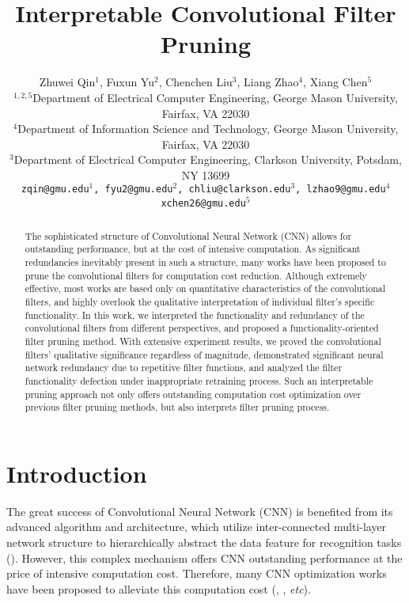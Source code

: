 \documentclass{article} %
\title{Interpretable Convolutional Filter Pruning}
\author{
	Zhuwei Qin$^1$, Fuxun Yu$^2$, Chenchen Liu$^3$, Liang Zhao$^4$, Xiang Chen$^5$ \\
	$^{1,2,5}$Department of Electrical Computer Engineering, George Mason University, Fairfax, VA 22030 \\
	$^{4}$Department of Information Science and Technology, George Mason University, Fairfax, VA 22030 \\
	$^{3}$Department of Electrical Computer Engineering, Clarkson University, Potsdam, NY 13699 \\
	\texttt{zqin@gmu.edu$^1$, fyu2@gmu.edu$^2$, chliu@clarkson.edu$^3$, lzhao9@gmu.edu$^4$}\\
	\texttt{xchen26@gmu.edu$^5$}
}
\begin{document}
\maketitle

\vspace{-3mm}
\begin{abstract}
The sophisticated structure of Convolutional Neural Network (CNN) allows for outstanding performance, but at the cost of intensive computation.
	As significant redundancies inevitably present in such a structure, many works have been proposed to prune the convolutional filters for computation cost reduction.
	Although extremely effective, most works are based only on quantitative characteristics of the convolutional filters, and highly overlook the qualitative interpretation of individual filter's specific functionality.
	In this work, we interpreted the functionality and redundancy of the convolutional filters from different perspectives, and proposed a functionality-oriented filter pruning method.
	With extensive experiment results, we proved the convolutional filters' qualitative significance regardless of magnitude, demonstrated significant neural network redundancy due to repetitive filter functions, and analyzed the filter functionality defection under inappropriate retraining process.
	Such an interpretable pruning approach not only offers outstanding computation cost optimization over previous filter pruning methods, but also interprets filter pruning process.
	
	
	
\end{abstract}
\section{Introduction}
The great success of Convolutional Neural Network (CNN) is benefited from its advanced algorithm and architecture, which utilize inter-connected multi-layer network structure to hierarchically abstract the data feature for recognition tasks (\cite{Kriz:2012:NIPS}).
	However, this complex mechanism offers CNN outstanding performance at the price of intensive computation cost.
	Therefore, many CNN optimization works have been proposed to alleviate this computation cost (\cite{han2015learning}, \cite{jaderberg2014speeding}, \textit{etc}).
\end{document}
